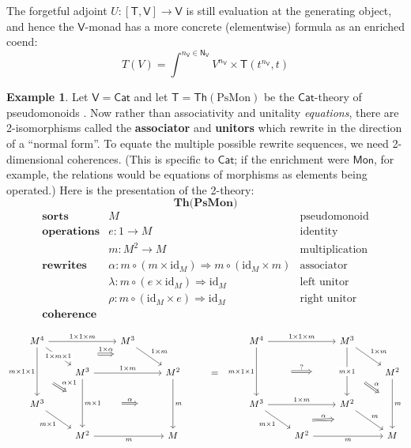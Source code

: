 \documentclass{amsart}
\theoremstyle{definition}
\newtheorem{example}[theorem]{Example}
\newcommand{\Th}{\mathsf{Th}}
\newcommand{\Cat}{\mathsf{Cat}}
\newcommand{\Mon}{\mathsf{Mon}}
\newcommand{\NN}{\mathsf{N}}
\newcommand{\V}{\mathsf{V}}
\newcommand{\T}{\mathsf{T}}
\newcommand{\maps}{\colon}
\newcommand{\id}{\mathrm{id}}
\begin{document}
The forgetful adjoint $U\maps [\T,\V] \to \V$ is still evaluation at the generating object, and hence the $\V$-monad has a more concrete (elementwise) formula as an enriched coend:
\begin{equation}
T(V) = \int^{n_\V\in \NN_\V} V^{n_\V} \times \T(t^{n_\V},t)
\end{equation}

\begin{example}
	Let $\V = \Cat$ and let $\T = \Th(\mathrm{PsMon})$ be the $\Cat$-theory of pseudomonoids \cite{pseudo}. Now rather than associativity and unitality \textit{equations}, there are 2-isomorphisms called the \textbf{associator} and \textbf{unitors} which rewrite in the direction of a ``normal form''. To equate the multiple possible rewrite sequences, we need 2-dimensional coherences. (This is specific to $\Cat$; if the enrichment were $\Mon$, for example, the relations would be equations of morphisms as elements being operated.) Here is the presentation of the 2-theory:$$\textbf{Th(PsMon)}$$
	\[\begin{array}{rll}
	\textbf{sorts} & M & \text{pseudomonoid}\\
	\textbf{operations} & e\maps1 \to M & \text{identity}\\
	& m\maps M^2 \to M & \text{multiplication}\\
	\textbf{rewrites} & \alpha \colon m \circ (m \times \id_M) \Rightarrow m \circ (\id_M \times m) & \text{associator}\\
	& \lambda\maps  m \circ (e \times \id_M) \Rightarrow \id_M & \text{left unitor}\\
	& \rho\maps m \circ (\id_M \times e) \Rightarrow \id_M & \text{right unitor}\\
	\textbf{coherence}
          \end{array}\]

        \[\begin{tikzcd}
          M^4 \ar[rr,"1\times 1\times m"] \ar[dr,"1\times m\times 1" description, ""name=a1] \ar[dd, "m\times 1\times 1",swap,""name=b1] && M^3 \ar[dr, "1\times m",""name=a2] \arrow[Rightarrow,"1\times \alpha",from=a1,to=a2,shorten >=1.3cm,shorten <=1.3cm] &&& M^4 \ar[rr, "1\times 1\times m"] \ar[dd,"m\times 1\times 1",swap,""name=d1] && M^3 \ar[dd,"m\times 1" description,""name=d2] \ar[dr,"1\times m"] \arrow[Rightarrow,"?",from=d1,to=d2,shorten >=1.3cm,shorten <=1.3cm] & \\
          & M^3 \ar[rr,"1\times m"] \ar[dd,"m\times 1",""name=b2] \arrow[Rightarrow,"\alpha\times 1",from=b1,to=b2,shorten >=0.7cm,shorten <=0.7cm] && M^2 \ar[dd,"m",""name=c1] & = & &&& M^2 \ar[dd,"m",""name=f1] \arrow[Rightarrow,"\alpha",from=d2,to=f1,shorten >=0.6cm,shorten <=0.6cm] \arrow[Rightarrow,"\alpha",from=b2,to=c1,shorten >=1.3cm,shorten <=1.3cm] \\
          M^3 \ar[dr,"m\times 1",swap] &&& && M^3 \ar[rr,"1\times m"] \ar[dr,"m\times 1",swap,,""name=e1] && M^2 \ar[dr,"m",,""name=e2] \arrow[Rightarrow,"\alpha",from=e1,to=e2,shorten >=1.3cm,shorten <=1.3cm] & \\
          & M^2 \ar[rr,"m",swap] && M && & M^2 \ar[rr,"m",swap] && M
        \end{tikzcd}\]


\end{example}
\end{document}
